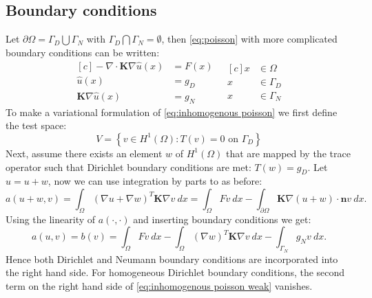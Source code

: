 \documentclass[../Main/main.tex]{subfiles}
\begin{document}
	\subsection*{Boundary conditions}
	Let $\partial \Omega = \Gamma_D\bigcup \Gamma_N$ with $\Gamma_D \bigcap \Gamma_N = \emptyset$, then \eqref{eq:poisson} with more complicated boundary conditions can be written:
	\begin{equation}\label{eq:inhomogenous poisson}
		\begin{aligned}[c]
			 - \nabla \cdot \pmb{K} \nabla \hat{u}(x) &= F(x) \\
			\hat{u}(x) &= g_D \\
			\pmb{K}\nabla \hat{u}(x) &= g_N
		\end{aligned}
		\ \ \
		\begin{aligned}[c]
			x &\in \Omega  \\
			x &\in \Gamma_D \\
			x &\in \Gamma_N
		\end{aligned}
	\end{equation}
	To make a variational formulation of \eqref{eq:inhomogenous poisson} we first define the test space:
	\begin{equation}
		V = \left \{ v\in H^1(\Omega): T(v)=0 \text{ on }\Gamma_D\right \}
	\end{equation}
	Next, assume there exists an element $w$ of $ H^1(\Omega)$ that are mapped by the trace operator such that Dirichlet boundary conditions are met: $T(w)=g_D$. Let $\hat{u} = u+w$, now we can use integration by parts to as before:
	\begin{equation}
		a(u+w,v) = \int_{\Omega}(\nabla u+\nabla w)^{T}\pmb{K} \nabla v \ dx = \int_{\Omega}Fv \ dx -\int_{\partial\Omega}\pmb{K}\nabla (u+w)\cdot \pmb{n}v \ dx .
	\end{equation}
	Using the linearity of $a(\cdot,\cdot)$ and inserting boundary conditions we get:
	\begin{equation}\label{eq:inhomogenous poisson weak}
		a(u,v) = b(v)= \int_{\Omega} Fv \ dx - \int_{\Omega}(\nabla w)^T\pmb{K} \nabla v \ dx - \int_{\Gamma_N} g_N v \ dx.
	\end{equation}
	Hence both Dirichlet and Neumann boundary conditions are incorporated into the right hand side. For homogeneous Dirichlet boundary conditions, the second term on the right hand side of \eqref{eq:inhomogenous poisson weak} vanishes. 
	
\end{document}
